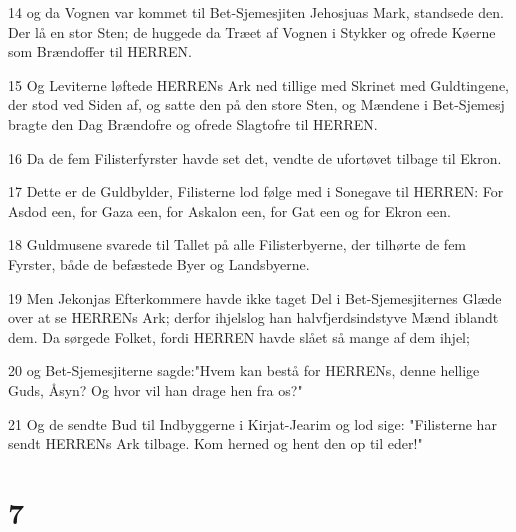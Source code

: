 \par 14 og da Vognen var kommet til Bet-Sjemesjiten Jehosjuas Mark, standsede den. Der lå en stor Sten; de huggede da Træet af Vognen i Stykker og ofrede Køerne som Brændoffer til HERREN.
\par 15 Og Leviterne løftede HERRENs Ark ned tillige med Skrinet med Guldtingene, der stod ved Siden af, og satte den på den store Sten, og Mændene i Bet-Sjemesj bragte den Dag Brændofre og ofrede Slagtofre til HERREN.
\par 16 Da de fem Filisterfyrster havde set det, vendte de ufortøvet tilbage til Ekron.
\par 17 Dette er de Guldbylder, Filisterne lod følge med i Sonegave til HERREN: For Asdod een, for Gaza een, for Askalon een, for Gat een og for Ekron een.
\par 18 Guldmusene svarede til Tallet på alle Filisterbyerne, der tilhørte de fem Fyrster, både de befæstede Byer og Landsbyerne.
\par 19 Men Jekonjas Efterkommere havde ikke taget Del i Bet-Sjemesjiternes Glæde over at se HERRENs Ark; derfor ihjelslog han halvfjerdsindstyve Mænd iblandt dem. Da sørgede Folket, fordi HERREN havde slået så mange af dem ihjel;
\par 20 og Bet-Sjemesjiterne sagde:"Hvem kan bestå for HERRENs, denne hellige Guds, Åsyn? Og hvor vil han drage hen fra os?"
\par 21 Og de sendte Bud til Indbyggerne i Kirjat-Jearim og lod sige: "Filisterne har sendt HERRENs Ark tilbage. Kom herned og hent den op til eder!"

\chapter{7}

